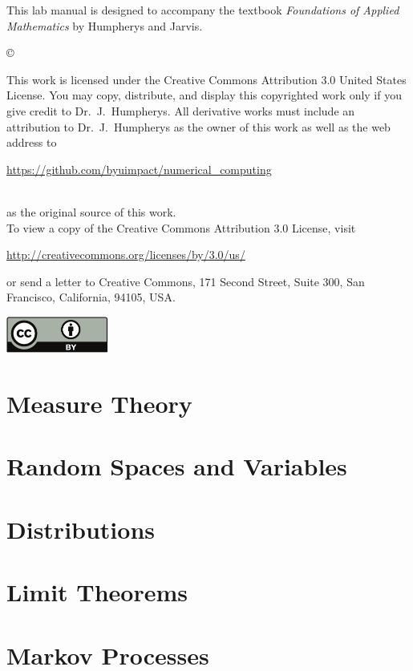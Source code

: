 \documentclass[nociteref]{newsiambook}
\begin{document}
\begin{thepreface}
This lab manual is designed to accompany the textbook \emph{Foundations of Applied Mathematics} by Humpherys and Jarvis.

\vfill
\copyright{This work is licensed under the Creative Commons Attribution 3.0 United States 
License.  You may copy, distribute, and display this copyrighted work only if you give 
credit to Dr.~J.~Humpherys. All derivative works must include an attribution to Dr.~J.~Humpherys as the owner of this work as well as the web address to 
\\\centerline{\url{https://github.com/byuimpact/numerical_computing}}\\ as the original source of 
this 
work.\\To view a copy of the Creative Commons Attribution 3.0 License, 
visit\\\centerline{\url{http://creativecommons.org/licenses/by/3.0/us/}} or send a letter to 
Creative Commons, 171 Second Street, Suite 300, San Francisco, California, 94105, USA.}

\vfill
\centering\includegraphics[height=1.2cm]{by}
\vfill
\end{thepreface}

\setcounter{tocdepth}{1}
\tableofcontents

\mainmatter

\part{Measure Theory}

\part{Random Spaces and Variables}

\part{Distributions}

\part{Limit Theorems}

\part{Markov Processes}
\end{document}
